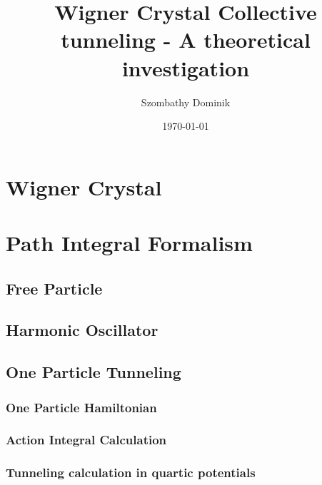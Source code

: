 




\usepackage{blindtext}



\title{Wigner Crystal Collective tunneling - A theoretical investigation}
\author{Szombathy Dominik}
	
	
\date{\today}



\begin{abstract}
	
\end{abstract}

\maketitle

\tableofcontents


\section{Wigner Crystal}
\section{Path Integral Formalism} 
	\subsection{Free Particle}
	\subsection{Harmonic Oscillator}
	\subsection{One Particle Tunneling}
		\subsubsection{One Particle Hamiltonian}
		\subsubsection{Action Integral Calculation}
		\subsubsection{Tunneling calculation in quartic potentials}
